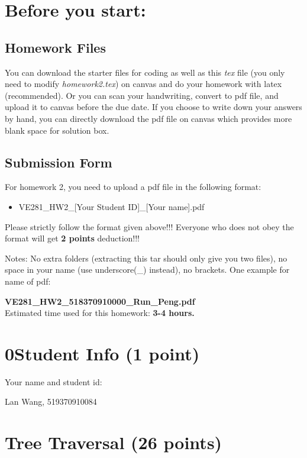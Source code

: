 \documentclass[11pt]{exam}
\begin{document}
\setlength{\parindent}{0pt}
\section*{Before you start:}

\subsection*{Homework Files}
You can download the starter files for coding as well as this \textit{tex} file (you only need to modify \textit{homework2.tex}) on canvas and do your homework with latex (recommended). Or you can scan your handwriting, convert to pdf file, and upload it to canvas before the due date. If you choose to write down your answers by hand, you can directly download the pdf file on canvas which provides more blank space for solution box.\\

\subsection*{Submission Form}
For homework 2, you need to upload a pdf file in the following format:
\begin{itemize}
\item VE281\_HW2\_[Your Student ID]\_[Your name].pdf

\end{itemize}
{\color{red}Please strictly follow the format given above!!! Everyone who does not obey the format will get \textbf{2 points} deduction!!!}

Notes: No extra folders (extracting this tar should only give you two files), no space in your name (use underscore(\_) instead), no brackets. One example for name of pdf:

\textbf{VE281\_HW2\_518370910000\_Run\_Peng.pdf}\\

Estimated time used for this homework: \textbf{3-4 hours.}

\newpage
\section*{0\quad Student Info (1 point)}
Your name and student id:
\begin{solution}
Lan Wang, 519370910084
\end{solution}

\section{Tree Traversal (26 points)}
\end{document}
